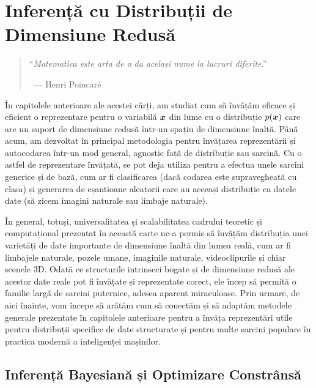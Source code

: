 \documentclass[../../book-main_ro.tex]{subfiles}
\begin{document}
\chapter{Inferență cu Distribuții de Dimensiune Redusă}
\label{ch:conditional-inference}

\begin{quote}

\hfill    ``{\em Matematica este arta de a da același nume la lucruri diferite}.''

$~$ \hfill --- Henri Poincar\'e 
\end{quote}
\vspace{5mm}


În capitolele anterioare ale acestei cărți, am studiat cum să învățăm eficace și eficient o reprezentare pentru o variabilă $\bm{x}$ din lume cu o distribuție $p(\bm{x})$ care are un suport de dimensiune redusă într-un spațiu de dimensiune înaltă. Până acum, am dezvoltat în principal metodologia pentru învățarea reprezentării și autocodarea într-un mod general, agnostic față de distribuție sau sarcină. Cu o astfel de reprezentare învățată, se pot deja utiliza pentru a efectua unele sarcini generice și de bază, cum ar fi clasificarea (dacă codarea este supravegheată cu clasa) și generarea de eșantioane aleatorii care au aceeași distribuție ca datele date (să zicem imagini naturale sau limbaje naturale).

În general, totuși, universalitatea și scalabilitatea cadrului teoretic și computațional prezentat în această carte ne-a permis să învățăm distribuția unei varietăți de date importante de dimensiune înaltă din lumea reală, cum ar fi limbajele naturale, pozele umane, imaginile naturale, videoclipurile și chiar scenele 3D. Odată ce structurile intrinseci bogate și de dimensiune redusă ale acestor date reale pot fi învățate și reprezentate corect, ele încep să permită o familie largă de sarcini puternice, adesea aparent miraculoase. Prin urmare, de aici înainte, vom începe să arătăm cum să conectăm și să adaptăm metodele generale prezentate în capitolele anterioare pentru a învăța reprezentări utile pentru distribuții specifice de date structurate și pentru multe sarcini populare în practica modernă a inteligenței mașinilor.

\section{Inferență Bayesiană și Optimizare Constrânsă}
\end{document}
